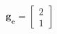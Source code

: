 \documentclass[preview]{standalone}
\begin{document}
\begin{align*}
\mathbf{g_e} = \begin{bmatrix} 2 \\ 1 \end{bmatrix}
\end{align*}
\end{document}
